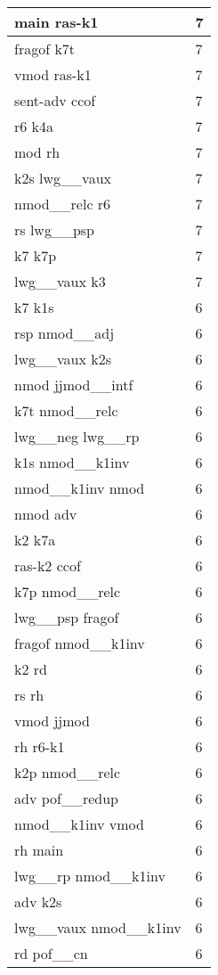 \documentclass[a4 paper]{article}
\begin{document}
\begin{longtable}{p{}p{}}
main ras-k1  & 7 \\ \midrule
fragof k7t  & 7 \\ \midrule
vmod ras-k1  & 7 \\ \midrule
sent-adv ccof  & 7 \\ \midrule
r6 k4a  & 7 \\ \midrule
mod rh  & 7 \\ \midrule
k2s lwg\_\_vaux  & 7 \\ \midrule
nmod\_\_relc r6  & 7 \\ \midrule
rs lwg\_\_psp  & 7 \\ \midrule
k7 k7p  & 7 \\ \midrule
lwg\_\_vaux k3  & 7 \\ \midrule
k7 k1s  & 6 \\ \midrule
rsp nmod\_\_adj  & 6 \\ \midrule
lwg\_\_vaux k2s  & 6 \\ \midrule
nmod jjmod\_\_intf  & 6 \\ \midrule
k7t nmod\_\_relc  & 6 \\ \midrule
lwg\_\_neg lwg\_\_rp  & 6 \\ \midrule
k1s nmod\_\_k1inv  & 6 \\ \midrule
nmod\_\_k1inv nmod  & 6 \\ \midrule
nmod adv  & 6 \\ \midrule
k2 k7a  & 6 \\ \midrule
ras-k2 ccof  & 6 \\ \midrule
k7p nmod\_\_relc  & 6 \\ \midrule
lwg\_\_psp fragof  & 6 \\ \midrule
fragof nmod\_\_k1inv  & 6 \\ \midrule
k2 rd  & 6 \\ \midrule
rs rh  & 6 \\ \midrule
vmod jjmod  & 6 \\ \midrule
rh r6-k1  & 6 \\ \midrule
k2p nmod\_\_relc  & 6 \\ \midrule
adv pof\_\_redup  & 6 \\ \midrule
nmod\_\_k1inv vmod  & 6 \\ \midrule
rh main  & 6 \\ \midrule
lwg\_\_rp nmod\_\_k1inv  & 6 \\ \midrule
adv k2s  & 6 \\ \midrule
lwg\_\_vaux nmod\_\_k1inv  & 6 \\ \midrule
rd pof\_\_cn  & 6 \\ \midrule

\end{longtable}
\end{document}
